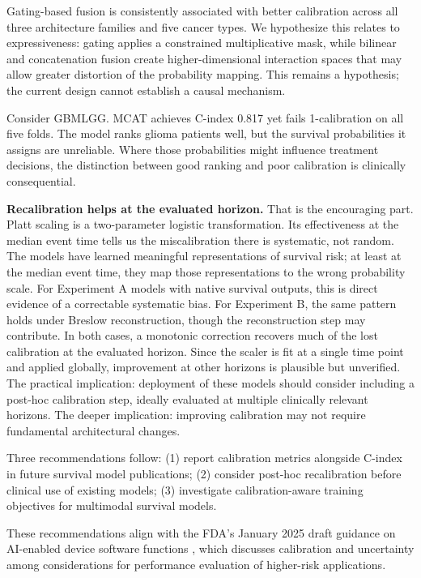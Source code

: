 \documentclass[pmlr]{jmlr}
\begin{document}
Gating-based fusion is consistently associated with better calibration across all three architecture families and five cancer types. We hypothesize this relates to expressiveness: gating applies a constrained multiplicative mask, while bilinear and concatenation fusion create higher-dimensional interaction spaces that may allow greater distortion of the probability mapping. This remains a hypothesis; the current design cannot establish a causal mechanism.

Consider GBMLGG. MCAT achieves C-index 0.817 yet fails 1-calibration on all five folds. The model ranks glioma patients well, but the survival probabilities it assigns are unreliable. Where those probabilities might influence treatment decisions, the distinction between good ranking and poor calibration is clinically consequential.

\textbf{Recalibration helps at the evaluated horizon.} That is the encouraging part. Platt scaling is a two-parameter logistic transformation. Its effectiveness at the median event time tells us the miscalibration there is systematic, not random. The models have learned meaningful representations of survival risk; at least at the median event time, they map those representations to the wrong probability scale. For Experiment A models with native survival outputs, this is direct evidence of a correctable systematic bias. For Experiment B, the same pattern holds under Breslow reconstruction, though the reconstruction step may contribute. In both cases, a monotonic correction recovers much of the lost calibration at the evaluated horizon. Since the scaler is fit at a single time point and applied globally, improvement at other horizons is plausible but unverified. The practical implication: deployment of these models should consider including a post-hoc calibration step, ideally evaluated at multiple clinically relevant horizons. The deeper implication: improving calibration may not require fundamental architectural changes.

Three recommendations follow: (1) report calibration metrics alongside C-index in future survival model publications; (2) consider post-hoc recalibration before clinical use of existing models; (3) investigate calibration-aware training objectives for multimodal survival models.

These recommendations align with the FDA's January 2025 draft guidance on AI-enabled device software functions \citep{fda2025aidsf}, which discusses calibration and uncertainty among considerations for performance evaluation of higher-risk applications.
\end{document}
